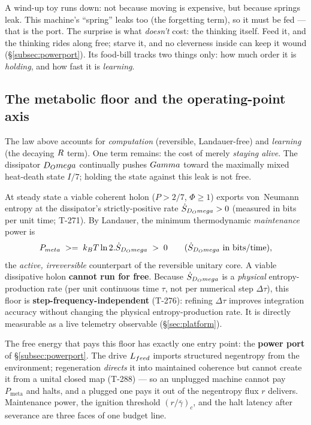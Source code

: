 \begin{zerobox}
A wind-up toy runs down: not because moving is expensive, but because springs
leak. This machine's ``spring'' leaks too (the forgetting term), so it must
be fed --- that is the port. The surprise is what \emph{doesn't} cost: the
thinking itself. Feed it, and the thinking rides along free; starve it, and no
cleverness inside can keep it wound (\S\ref{subsec:powerport}). Its
food-bill tracks two things only: how much order it is \emph{holding}, and
how fast it is \emph{learning}.
\end{zerobox}

\subsection{The metabolic floor and the operating-point axis}
\label{subsec:metabolic}

The law above accounts for \emph{computation} (reversible, Landauer-free) and
\emph{learning} (the decaying $R$ term). One term remains: the cost of
merely \emph{staying alive}. The dissipator $D_Omega$ continually pushes $Gamma$
toward the maximally mixed heat-death state $I/7$; holding the state against
this leak is not free.

\begin{claimbox}
At steady state a viable coherent holon ($P>2/7$, $\Phi\ge 1$) exports
von~Neumann entropy at the dissipator's strictly-positive rate
$\dot S_{D_Omega}>0$ (measured in bits per unit time; T-271). By Landauer, the
minimum thermodynamic \emph{maintenance} power is
\[
  P_{meta} \;>=\; k_B T\ln 2. \dot S_{D_Omega} \;>\; 0
  \qquad (\dot S_{D_Omega}\text{ in bits/time}),
\]
the \emph{active, irreversible} counterpart of the reversible unitary core. A
viable dissipative holon \textbf{cannot run for free}. Because $\dot S_{D_Omega}$
is a \emph{physical} entropy-production rate (per unit continuous time $\tau$,
not per numerical step $\Delta\tau$), this floor is
\textbf{step-frequency-independent} (T-276): refining $\Delta\tau$ improves
integration accuracy without changing the physical entropy-production rate. It
is directly measurable as a live telemetry observable (\S\ref{sec:platform}).
\end{claimbox}

The free energy that pays this floor has exactly one entry point: the
\textbf{power port} of \S\ref{subsec:powerport}. The drive
$L_{feed}$ imports structured negentropy from the environment;
regeneration \emph{directs} it into maintained coherence but cannot create it
from a unital closed map (T-288) --- so an unplugged machine cannot pay
$P_{\mathrm{meta}}$ and halts, and a plugged one pays it out of the negentropy
flux $r$ delivers. Maintenance power, the ignition threshold $(r/\bar\gamma)_c$,
and the halt latency after severance are three faces of one budget line.

